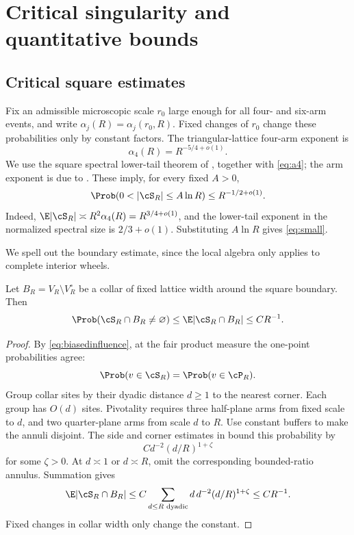 \section{Critical singularity and quantitative bounds}\label{sec:criticalrates}
\subsection{Critical square estimates}\label{sec:critical}

Fix an admissible microscopic scale $r_0$ large enough for all four- and six-arm events, and write $\alpha_j(R)=\alpha_j(r_0,R)$. Fixed changes of $r_0$ change these probabilities only by constant factors. The triangular-lattice four-arm exponent is
\begin{equation}\label{eq:a4}
 \alpha_4(R)=R^{-5/4+o(1)}.
\end{equation}
We use the square spectral lower-tail theorem of \cite[Theorem~1.1 and equation~(1.7)]{GPS}, together with \eqref{eq:a4}; the arm exponent is due to \cite{SW}. These imply, for every fixed $A>0$,
\begin{equation}\label{eq:small}
 \Prob(0<|\cS_R|\le A\ln R)\le R^{-1/2+o(1)}.
\end{equation}
Indeed, $\E|\cS_R|\asymp R^2\alpha_4(R)=R^{3/4+o(1)}$, and the lower-tail exponent in the normalized spectral size is $2/3+o(1)$. Substituting $A\ln R$ gives \eqref{eq:small}.

We spell out the boundary estimate, since the local algebra only applies to complete interior wheels.

\begin{lemma}\label{lem:boundary}
Let $B_R=V_R\setminus V_R^\circ$ be a collar of fixed lattice width around the square boundary. Then
\[
 \Prob(\cS_R\cap B_R\ne\varnothing)
 \le\E|\cS_R\cap B_R|\le C R^{-1}.
\]
\end{lemma}
\begin{proof}
By \eqref{eq:biasedinfluence}, at the fair product measure the one-point probabilities agree:
\[
 \Prob(v\in\cS_R)=\Prob(v\in\cP_R).
\]
Group collar sites by their dyadic distance $d\ge1$ to the nearest corner. Each group has $O(d)$ sites. Pivotality requires three half-plane arms from fixed scale to $d$, and two quarter-plane arms from scale $d$ to $R$. Use constant buffers to make the annuli disjoint. The side and corner estimates in \cite[equations~(4.12)--(4.13) and Section~7.2]{GPS} bound this probability by
\[
 C d^{-2}(d/R)^{1+\zeta}
\]
for some $\zeta>0$. At $d\asymp1$ or $d\asymp R$, omit the corresponding bounded-ratio annulus. Summation gives
\[
 \E|\cS_R\cap B_R|
 \le C\sum_{d\le R\text{ dyadic}}d\,d^{-2}(d/R)^{1+\zeta}
 \le C R^{-1}.
\]
Fixed changes in collar width only change the constant.
\end{proof}

